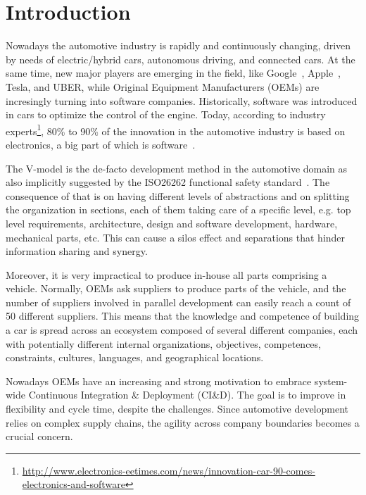\section{Introduction}\label{sec:intro}


Nowadays the automotive industry is rapidly and continuously changing, driven by needs of 
electric/hybrid cars, autonomous driving, and connected cars. At the same time, new major players are emerging in the field, like Google~\cite{Google}, Apple~\cite{Apple,Apple2}, Tesla, and UBER, while Original Equipment Manufacturers (OEMs) are incresingly turning into software companies. 
Historically, software was introduced in cars to optimize the control of the engine. 
Today, according to industry experts\footnote{\url{http://www.electronics-eetimes.com/news/innovation-car-90-comes-electronics-and-software}}, 80\% to 90\% of the innovation in the automotive industry is based on electronics, a big part of which is software~\cite{ESEM2016}. 

The V-model is the de-facto development method in the automotive domain as also implicitly suggested by the ISO26262 functional safety standard~\cite{iso26262}. The consequence of that is on having 
different levels of abstractions and on splitting the organization in sections, each of them taking care of a specific level, e.g. top level requirements,
architecture, design and software development, hardware, mechanical parts, etc. 
This can cause a silos effect and separations that hinder information sharing and synergy.

Moreover, it is very impractical to produce in-house all parts comprising a vehicle. Normally, OEMs 
ask suppliers to produce parts of the vehicle, and the number of suppliers involved in parallel development can easily reach a count of 50 different suppliers. 
This means that the knowledge and competence of building a car is spread across an ecosystem composed of several different companies, each with potentially different internal organizations, objectives, competences, constraints, cultures, languages, and geographical locations. 

Nowadays OEMs have an increasing and strong motivation
to embrace system-wide Continuous Integration \& Deployment (CI\&D). The goal is to improve
in flexibility and cycle time, despite the challenges. 
Since automotive development relies on complex supply chains, the agility across company boundaries becomes a crucial concern.

